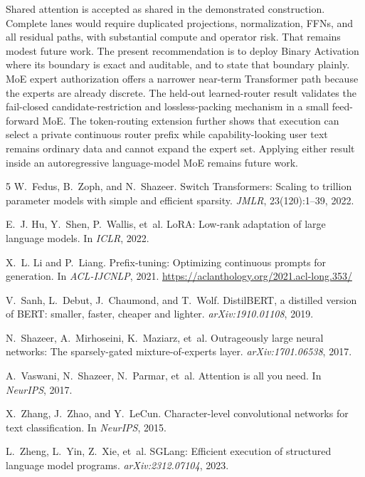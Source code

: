 \documentclass[11pt]{article}
\begin{document}
Shared attention is accepted as shared in the demonstrated construction.
Complete lanes would require duplicated projections, normalization, FFNs, and
all residual paths, with substantial compute and operator risk. That remains
modest future work. The present recommendation is to deploy Binary Activation
where its boundary is exact and auditable, and to state that boundary plainly.
MoE expert authorization offers a narrower near-term Transformer path because
the experts are already discrete. The held-out learned-router result validates
the fail-closed candidate-restriction and lossless-packing mechanism in a small
feed-forward MoE. The token-routing extension further shows that execution can
select a private continuous router prefix while capability-looking user text
remains ordinary data and cannot expand the expert set. Applying either result
inside an autoregressive language-model MoE remains future work.

\begin{thebibliography}{5}
W.~Fedus, B.~Zoph, and N.~Shazeer.
\newblock Switch Transformers: Scaling to trillion parameter models with simple and efficient sparsity.
\newblock \emph{JMLR}, 23(120):1--39, 2022.

E.~J. Hu, Y.~Shen, P.~Wallis, et~al.
\newblock LoRA: Low-rank adaptation of large language models.
\newblock In \emph{ICLR}, 2022.

X.~L. Li and P.~Liang.
\newblock Prefix-tuning: Optimizing continuous prompts for generation.
\newblock In \emph{ACL-IJCNLP}, 2021.
\newblock \url{https://aclanthology.org/2021.acl-long.353/}

V.~Sanh, L.~Debut, J.~Chaumond, and T.~Wolf.
\newblock DistilBERT, a distilled version of BERT: smaller, faster, cheaper and lighter.
\newblock \emph{arXiv:1910.01108}, 2019.

N.~Shazeer, A.~Mirhoseini, K.~Maziarz, et~al.
\newblock Outrageously large neural networks: The sparsely-gated mixture-of-experts layer.
\newblock \emph{arXiv:1701.06538}, 2017.

A.~Vaswani, N.~Shazeer, N.~Parmar, et~al.
\newblock Attention is all you need.
\newblock In \emph{NeurIPS}, 2017.

X.~Zhang, J.~Zhao, and Y.~LeCun.
\newblock Character-level convolutional networks for text classification.
\newblock In \emph{NeurIPS}, 2015.

L.~Zheng, L.~Yin, Z.~Xie, et~al.
\newblock SGLang: Efficient execution of structured language model programs.
\newblock \emph{arXiv:2312.07104}, 2023.
\end{thebibliography}
\end{document}
